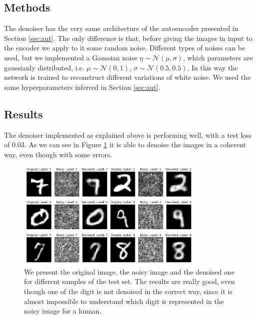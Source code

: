 \subsection{Methods}
The denoiser has the very same architecture of the autoencoder presented in Section \ref{sec:aut}.
The only difference is that, before giving the images in input to the encoder we apply to it some random noise. 
Different types of noises can be used, but we implemented a Gaussian noise $\eta \sim \mathcal{N}(\mu, \sigma)$, 
which parameters are gaussianly distributed, i.e. $\mu \sim \mathcal{N}(0, 1)$, $\sigma \sim \mathcal{N}(0.5, 0.5)$.
In this way the network is trained to reconstruct different variations of white noise.
We used the same hyperparameters inferred in Section \ref{sec:aut}.


\subsection{Results}
The denoiser implemented as explained above is performing well, with a test loss of $0.03$. As we can see in Figure \ref{fig:noise} it is able to denoise 
the images in a coherent way, even though with some errors.
\begin{figure}[h]
    \centering
    \includegraphics[width=0.8\textwidth]{Images/noise.png}
    \caption{We present the original image, the noisy image and the denoised one for different samples of the test set. The results are really good, even though
    one of the digit is not denoised in the correct way, since it is almost impossible to understand which digit is represented in the noisy image for a 
    human.}
    \label{fig:noise}
\end{figure}